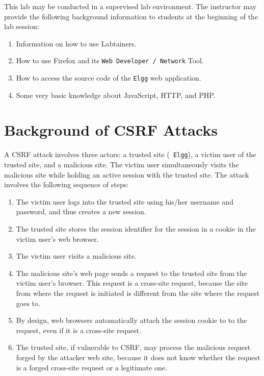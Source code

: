 This lab may be conducted in a
supervised lab environment. The instructor may provide the following
background information to students at the beginning of the lab session:
\begin{enumerate}
  \item Information on how to use Labtainers.
  \item How to use Firefox and its {\tt Web Developer / Network} Tool.
  \item How to access the source code of the {\tt Elgg} web application. 
  \item Some very basic knowledge about JavaScript, HTTP, and PHP.
       
\end{enumerate}

\section{Background of CSRF Attacks}

A CSRF attack involves three actors: a trusted site ({\tt
Elgg}), a victim user of the trusted site, and a malicious site. 
The victim user simultaneously visits the
malicious site while holding an active session with the trusted site.
The attack involves the following sequence of steps:
\begin{enumerate}
  \item The victim user logs into the trusted site using his/her
    username and password, and thus creates a new session.

  \item The trusted site stores the session identifier for the session
    in a cookie in the victim user's web browser. 

  \item The victim user visits a malicious site.

  \item The malicious site's web page sends a
    request to the trusted site from the victim user's browser. This
    request is a cross-site request, because the site from where the request is
    initiated is different from the site where the request goes to.

  \item By design, web browsers automatically attach the session cookie to
    to the request, even if it is a cross-site request. 

  \item The trusted site, if vulnerable to CSRF, may process the malicious 
    request forged by the attacker web site, because it does not know
    whether the request is a forged cross-site request or a legitimate one.
\end{enumerate}


